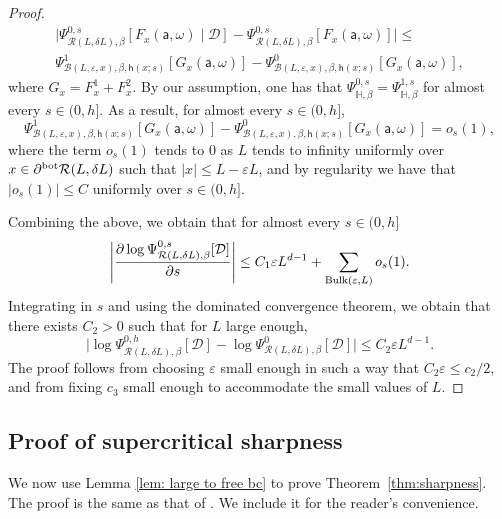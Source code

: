 \documentclass[11pt,a4paper]{article}
\numberwithin{equation}{section}
\theoremstyle{plain}
\theoremstyle{definition}
\begin{document}
\begin{proof}
\begin{multline}
\Big|\Psi^{0,s}_{\mathcal R(L,\delta L),\beta}\left[F_x(\mathsf{a},\omega)\mid  \mathcal{D}\right]-\Psi^{0,s}_{\mathcal R(L,\delta L),\beta}\left[F_x(\mathsf{a},\omega) \right]\Big| \leq \\ \Psi^{1}_{\mathcal{B}(L,\varepsilon,x),\beta,\mathsf{h}(x;s)}\left[G_x(\mathsf{a},\omega)\right] -\Psi^{0}_{\mathcal{B}(L,\varepsilon,x),\beta,\mathsf{h}(x;s)}\left[G_x(\mathsf{a},\omega)\right],  
\end{multline}
where $G_x=F^1_x+F^2_x$.
By our assumption, one has that $\Psi^{0,s}_{\mathbb H,\beta}=\Psi^{1,s}_{\mathbb H,\beta}$ for almost every $s\in (0,h]$. As a result, for almost every $s \in (0,h]$,
\begin{equation}\label{eq: summand goes to 0 far away from the boundary}
   \Psi^{1}_{\mathcal{B}(L,\varepsilon,x),\beta,\mathsf{h}(x;s)}\left[G_x(\mathsf{a},\omega)\right]-\Psi^{0}_{\mathcal{B}(L,\varepsilon,x),\beta,\mathsf{h}(x;s)}\left[G_x(\mathsf{a},\omega)\right]=o_s(1),
\end{equation}
where the term $o_s(1)$ tends to $0$ as $L$ tends to infinity uniformly over $x\in \partial^{\rm bot}\mathcal{R}(L,\delta L)$ such that $|x|\leq L-\varepsilon L$, and by regularity we have that $|o_s(1)|\leq C$ uniformly over $s\in (0,h]$.

Combining the above, we obtain that for almost every $s\in (0,h]$
\begin{equation}
\Bigg|\frac{\partial \log \Psi^{0,s}_{\mathcal R(L,\delta L),\beta}[ \mathcal{D} ]}{\partial s}\Bigg|\leq C_1 \varepsilon L^{d-1}+ \sum_{{\rm Bulk}(\varepsilon,L)} o_s(1).
\end{equation}
Integrating in $s$ and using the dominated convergence theorem, we obtain that there exists $C_2>0$ such that for $L$ large enough,
\begin{equation}
\Big|\log \Psi^{0,h}_{\mathcal R(L,\delta L),\beta}[ \mathcal{D} ]- \log \Psi^{0}_{\mathcal R(L,\delta L),\beta}[ \mathcal{D} ]\Big|\leq C_2\varepsilon L^{d-1}.  
\end{equation}
The proof follows from choosing $\varepsilon$ small enough in such a way that $C_2\varepsilon \leq c_2/2$, and from fixing $c_3$ small enough to accommodate the small values of $L$.
\end{proof}


\subsection{Proof of supercritical sharpness}
We now use Lemma \ref{lem: large to free bc} to prove Theorem~\ref{thm:sharpness}. The proof is the same as that of \cite[Theorem 5.1]{gunaratnam2025supercritical}. We include it for the reader's convenience.
\end{document}
